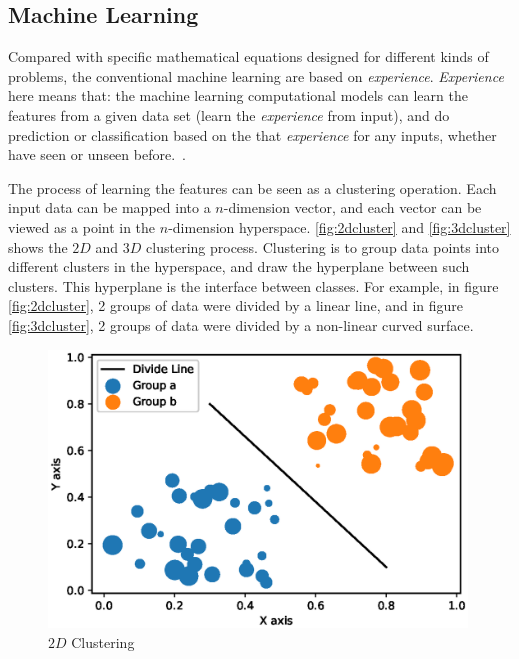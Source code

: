 \begin{spacing}{1.5}
\subsection{Machine Learning}

Compared with specific mathematical equations designed for different kinds of problems, the conventional machine learning are based on \textit{experience}. \textit{Experience} here means that: the machine learning computational models can learn the features from a given data set (learn the \textit{experience} from input), and do prediction or classification based on the that \textit{experience} for any inputs, whether have seen or unseen before.~\cite{mohri2018foundations}.

The process of learning the features can be seen as a clustering operation. Each input data can be mapped into a $n$-dimension vector, and each vector can be viewed as a point in the $n$-dimension hyperspace. \autoref{fig:2dcluster} and \autoref{fig:3dcluster} shows the $2D$ and $3D$ clustering process. Clustering is to group data points into different clusters in the hyperspace, and draw the hyperplane between such clusters. This hyperplane is the interface between classes. For example, in figure \autoref{fig:2dcluster}, 2 groups of data were divided by a linear line, and in figure \autoref{fig:3dcluster}, 2 groups of data were divided by a non-linear curved surface.

\begin{figure}[ht]
\centering
\includegraphics[width=0.99\textwidth, fbox]{Chapter2/2dcluster.eps}
\caption{$2D$ Clustering}
\label{fig:2dcluster} 
\end{figure}

% 


\end{spacing}
